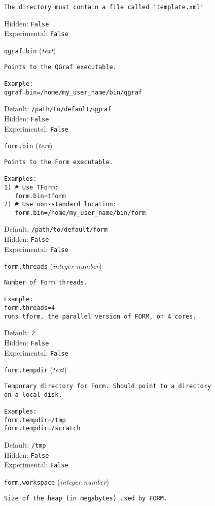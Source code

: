 \begin{basedescript}{\desclabelstyle{\pushlabel}}
\begin{verbatim}
The directory must contain a file called 'template.xml'
\end{verbatim}
Hidden: \verb|False|
\\Experimental: \verb|False|
\\\item[\colorbox{gray!30}{\texttt{qgraf.bin}}] (\textit{text})
\begin{verbatim}
Points to the QGraf executable.

Example:
qgraf.bin=/home/my_user_name/bin/qgraf
\end{verbatim}
Default: \verb|/path/to/default/qgraf|
\\Hidden: \verb|False|
\\Experimental: \verb|False|
\\\item[\colorbox{gray!30}{\texttt{form.bin}}] (\textit{text})
\begin{verbatim}
Points to the Form executable.

Examples:
1) # Use TForm:
   form.bin=tform
2) # Use non-standard location:
   form.bin=/home/my_user_name/bin/form
\end{verbatim}
Default: \verb|/path/to/default/form|
\\Hidden: \verb|False|
\\Experimental: \verb|False|
\\\item[\colorbox{gray!30}{\texttt{form.threads}}] (\textit{integer number})
\begin{verbatim}
Number of Form threads.

Example:
form.threads=4
runs tform, the parallel version of FORM, on 4 cores.
\end{verbatim}
Default: \verb|2|
\\Hidden: \verb|False|
\\Experimental: \verb|False|
\\\item[\colorbox{gray!30}{\texttt{form.tempdir}}] (\textit{text})
\begin{verbatim}
Temporary directory for Form. Should point to a directory
on a local disk.

Examples:
form.tempdir=/tmp
form.tempdir=/scratch
\end{verbatim}
Default: \verb|/tmp|
\\Hidden: \verb|False|
\\Experimental: \verb|False|
\\\item[\colorbox{gray!30}{\texttt{form.workspace}}] (\textit{integer number})
\begin{verbatim}
Size of the heap (in megabytes) used by FORM.


\end{verbatim}
\end{basedescript}
